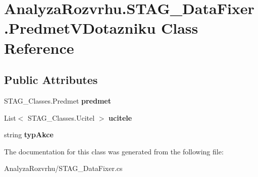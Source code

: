 \hypertarget{class_analyza_rozvrhu_1_1_s_t_a_g___data_fixer_1_1_predmet_v_dotazniku}{}\section{Analyza\+Rozvrhu.\+S\+T\+A\+G\+\_\+\+Data\+Fixer.\+Predmet\+V\+Dotazniku Class Reference}
\label{class_analyza_rozvrhu_1_1_s_t_a_g___data_fixer_1_1_predmet_v_dotazniku}
\subsection*{Public Attributes}
\begin{DoxyCompactItemize}
\item 
\mbox{\label{class_analyza_rozvrhu_1_1_s_t_a_g___data_fixer_1_1_predmet_v_dotazniku_a362a0987745cc3d225ba2d4b9f381fec}} 
S\+T\+A\+G\+\_\+\+Classes.\+Predmet {\bfseries predmet}
\item 
\mbox{\label{class_analyza_rozvrhu_1_1_s_t_a_g___data_fixer_1_1_predmet_v_dotazniku_a6dff607d23cfa6c582f218934eb8ce3c}} 
List$<$ S\+T\+A\+G\+\_\+\+Classes.\+Ucitel $>$ {\bfseries ucitele}
\item 
\mbox{\label{class_analyza_rozvrhu_1_1_s_t_a_g___data_fixer_1_1_predmet_v_dotazniku_aea0fbb3d4d13311c57b28011a9828a93}} 
string {\bfseries typ\+Akce}
\end{DoxyCompactItemize}


The documentation for this class was generated from the following file\+:\begin{DoxyCompactItemize}
\item 
Analyza\+Rozvrhu/S\+T\+A\+G\+\_\+\+Data\+Fixer.\+cs\end{DoxyCompactItemize}
